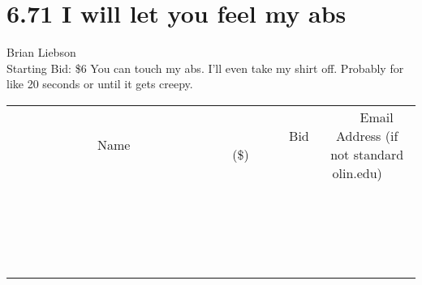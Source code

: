 \documentclass[11pt]{article}
\begin{document}
\section*{6.71 I will let you feel my abs}
Brian Liebson
\\
Starting Bid: \$6
\newline
You can touch my abs. I'll even take my shirt off. Probably for like 20 seconds or until it gets creepy.
\\[3ex]
\begin{tabular}{c c c}
~~~~~~~~~~~~~Name~~~~~~~~~~~~~ & ~~~~~~~~~Bid (\$)~~~~~~~~~  & ~~~Email Address (if not standard olin.edu)~~~\\
 & & \\
\hline
 & & \\
\hline
 & & \\
\hline
 & & \\
\hline
 & & \\
\hline
 & & \\
\hline
 & & \\
\hline
 & & \\
\hline
 & & \\
\hline
 & & \\
\hline
 & & \\
\hline
 & & \\
\hline
 & & \\
\hline
 & & \\
\hline
 & & \\
\hline
 & & \\
\hline
 & & \\
\hline
 & & \\
\hline
 & & \\
\hline
\end{tabular}
\newpage
\end{document}
